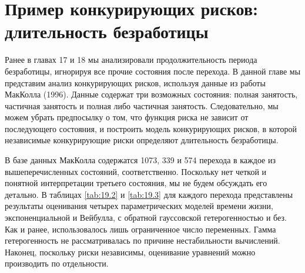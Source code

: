 \section{Пример конкурирующих рисков: длительность безработицы}\label{sec:19.5}

\noindent
Ранее в главах 17 %
и 18 %
мы анализировали продолжительность периода безработицы, игнорируя все прочие состояния после перехода. В данной главе мы представим анализ конкурирующих рисков, используя данные из работы МакКолла (1996). Данные содержат три возможных состояния: полная занятость, частичная занятость и полная либо частичная занятость. Следовательно, мы можем убрать предпосылку о том, что функция риска не зависит от последующего состояния, и построить модель конкурирующих рисков, в которой независимые конкурирующие риски определяют длительность безработицы.

В базе данных МакКолла содержатся 1073, 339 и 574 перехода в каждое из вышеперечисленных состояний, соответственно. Поскольку нет четкой и понятной интерпретации третьего состояния, мы не будем обсуждать его детально. В таблицах \ref{tab:19.2} и \ref{tab:19.3} для каждого перехода представлены результаты оценивания четырех параметрических моделей времени жизни, экспоненциальной и Вейбулла, с обратной гауссовской гетерогенностью и без. Как и ранее, использовалось лишь ограниченное число переменных. Гамма гетерогенность не рассматривалась по причине нестабильности вычислений. Наконец, поскольку риски независимы, оценивание уравнений можно производить по отдельности.

